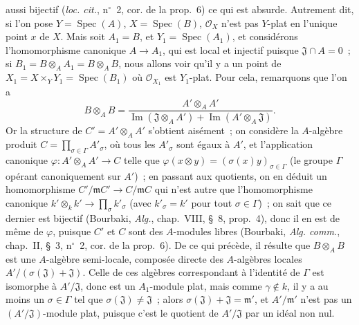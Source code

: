 \begin{env}[11.7.1]
aussi bijectif (\emph{loc. cit.}, n$^\circ$~2, cor. de la prop.~6) ce qui est
absurde. Autrement dit, si l'on pose $Y=\operatorname{Spec}(A)$,
$X=\operatorname{Spec}(B)$, $\mathcal O_X$ n'est pas $Y$-plat en l'unique point
$x$ de $X$. Mais soit $A_1=B$, et $Y_1=\operatorname{Spec}(A_1)$, et considérons
l'homomorphisme canonique $A\to A_1$, qui est local et injectif puisque
$\mathfrak J\cap A=0$~; si
$B_1=B\otimes_A A_1=B\otimes_A B$, nous allons voir qu'il y a un point de
$X_1=X\times_Y Y_1=\operatorname{Spec}(B_1)$ où $\mathcal O_{X_1}$ est
$Y_1$-plat. Pour cela, remarquons que l'on a
\[
B\otimes_A B
=\frac{A'\otimes_A A'}
{\operatorname{Im}(\mathfrak J\otimes_A A')
+\operatorname{Im}(A'\otimes_A\mathfrak J)}.
\]
Or la structure de $C'=A'\otimes_A A'$ s'obtient aisément~; on considère la
$A$-algèbre produit $C=\prod_{\sigma\in\Gamma}A'_{\sigma}$, où tous les
$A'_{\sigma}$ sont égaux à $A'$, et l'application canonique
$\varphi:A'\otimes_A A'\to C$ telle que
$\varphi(x\otimes y)=(\sigma(x)y)_{\sigma\in\Gamma}$ (le groupe $\Gamma$
opérant canoniquement sur $A'$)~; en passant aux quotients, on en déduit un
homomorphisme $C'/\mathfrak m C'\to C/\mathfrak m C$ qui n'est autre que
l'homomorphisme canonique
$k'\otimes_k k'\to\prod_{\sigma}k'_{\sigma}$ (avec $k'_{\sigma}=k'$ pour tout
$\sigma\in\Gamma$)~; on sait que ce dernier est bijectif (Bourbaki,
\emph{Alg.}, chap.~VIII, \S~8, prop.~4), donc il en est de même de $\varphi$,
puisque $C'$ et $C$ sont des $A$-modules libres (Bourbaki,
\emph{Alg. comm.}, chap.~II, \S~3, n$^\circ$~2, cor. de la prop.~6). De ce qui
précède, il résulte que $B\otimes_A B$ est une $A$-algèbre semi-locale, composée
directe des $A$-algèbres locales $A'/(\sigma(\mathfrak J)+\mathfrak J)$. Celle
de ces algèbres correspondant à l'identité de $\Gamma$ est isomorphe à
$A'/\mathfrak J$, donc est un $A_1$-module plat, mais comme $\gamma\notin k$, il
y a au moins un $\sigma\in\Gamma$ tel que
$\sigma(\mathfrak J)\ne\mathfrak J$~; alors
$\sigma(\mathfrak J)+\mathfrak J=\mathfrak m'$, et $A'/\mathfrak m'$ n'est pas
un $(A'/\mathfrak J)$-module plat, puisque c'est le quotient de
$A'/\mathfrak J$ par un idéal non nul.
\end{env}

